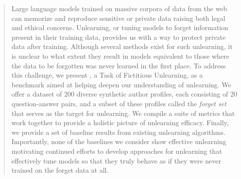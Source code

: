 \begin{abstract}
Large language models trained on massive corpora of data from the web can memorize and reproduce sensitive or private data
raising both legal and ethical concerns.
Unlearning, or tuning models to forget information present in their training data, provides us with a way to protect private data after training.  
Although several methods exist for such unlearning, it is unclear to what extent they result in models equivalent to those where the data to be forgotten was never learned in the first place.
To address this challenge, we present \tofu{}, a Task of Fictitious Unlearning, as a benchmark aimed at helping deepen our understanding of unlearning.  
We offer a dataset of $200$ diverse synthetic author profiles, each consisting of 20 question-answer pairs, and a subset of these profiles called the \emph{forget set} that serves as the target for unlearning.
We compile a suite of metrics that work together to provide a holistic picture of unlearning efficacy.
Finally, we provide a set of baseline results from existing unlearning algorithms.
Importantly, none of the baselines we consider show effective unlearning motivating continued efforts to develop approaches for unlearning that effectively tune models so that they truly behave as if they were never trained on the forget data at all.
\end{abstract}